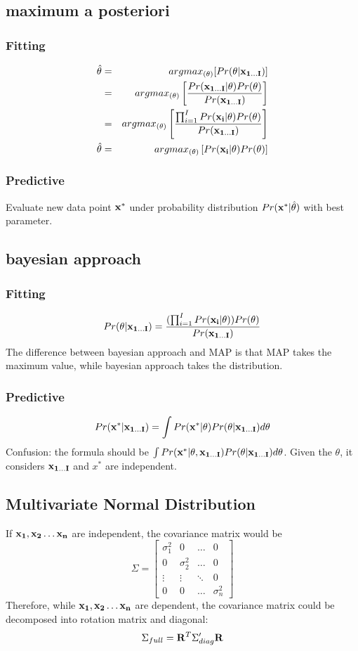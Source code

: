 \documentclass[12pt,a4paper]{article}
\begin{document}
\subsection*{maximum a posteriori}
\subsubsection*{Fitting}
\begin{eqnarray*}
\hat{\theta} &=& argmax_{(\theta)}[Pr(\theta|{\bf x_{1\ldots I}})] \\
&=& argmax_{(\theta)}\left[\frac{Pr({\bf x_{1\ldots I}}|\theta)Pr(\theta)}{Pr({\bf x_{1\ldots I}})}\right]\\
&=& argmax_{(\theta)}\left[\frac{\prod_{i=1}^{I}Pr({\bf x_i}|\theta)Pr(\theta)}{Pr({\bf x_{1\ldots I}})}\right]\\
\hat{\theta} &=& argmax_{(\theta)}\left[Pr({\bf x_i}|\theta)Pr(\theta)\right]
\end{eqnarray*}
\subsubsection*{Predictive}
Evaluate new data point $\bf x^*$ under probability distribution $Pr({\bf x^*}|\hat{\theta})$ with best parameter.
\subsection*{bayesian approach}
\subsubsection*{Fitting}
$$
Pr(\theta|{\bf x_{1\ldots I}}) = \frac{(\prod_{i=1}^{I}Pr({\bf x_i}|\theta))Pr(\theta)}{Pr({\bf x_{1\ldots I}})}
$$
The difference between bayesian approach and MAP is that MAP takes the maximum value, while bayesian approach takes the distribution.
\subsubsection*{Predictive}
$$
Pr({\bf x^*|{\bf x_{1\ldots I}}}) = \int Pr({\bf x^*|\theta})Pr(\theta|{\bf x_{1\ldots I}})d\theta
$$
Confusion: the formula should be $\int Pr({\bf x^*|\theta, x_{1\ldots I}})Pr(\theta|{\bf x_{1\ldots I}})d\theta$. Given the $\theta$, it considers ${\bf x_{1\ldots I}}$ and $x^*$ are independent. 
\subsection*{Multivariate Normal Distribution}
If ${\bf x_1, x_2\ldots x_n}$ are independent, the covariance matrix would be 
$$
\Sigma = \left[\begin{matrix} 
\sigma_1^2 & 0 & \ldots & 0\\
0 & \sigma_2^2 & \ldots & 0\\
\vdots & \vdots & \ddots & 0 \\
0 & 0 & \ldots & \sigma_n^2
\end{matrix}
\right]
$$
Therefore, while ${\bf x_1, x_2\ldots x_n}$ are dependent, the covariance matrix could be decomposed into rotation matrix and diagonal:
$$
\Sigma_{full} = {\bf R}^T\Sigma_{diag}'{\bf R}
$$
\end{document}
